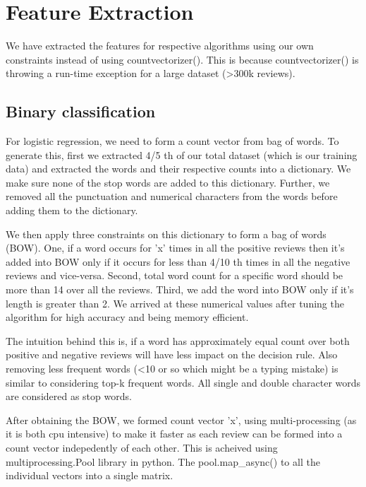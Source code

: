 \documentclass{article}
\begin{document}

\section{Feature Extraction}

We have extracted the features for respective algorithms using our own constraints instead of using countvectorizer(). This is because countvectorizer() is throwing a run-time exception for a large dataset (\textgreater300k reviews).

\subsection{Binary classification}
For logistic regression, we need to form a count vector from bag of words. To generate this, first we extracted 4/5 th of our total dataset (which is our training data) and extracted the words and their respective counts into a dictionary. We make sure none of the stop words are added to this dictionary. Further, we removed all the punctuation and numerical characters from the words before adding them to the dictionary. 


We then apply three constraints on this dictionary to form a bag of words (BOW). One, if a word occurs for 'x' times in all the positive reviews then it's added into BOW only if it occurs for less than 4/10 th times in all the negative reviews and vice-versa. Second, total word count for a specific word should be more than 14 over all the reviews. Third, we add the word into BOW only if it's length is greater than 2. We arrived at these numerical values after tuning the algorithm for high accuracy and being memory efficient. 


The intuition behind this is, if a word has approximately equal count over both positive and negative reviews will have less impact on the decision rule. Also removing less frequent words (\textless10 or so which might be a typing mistake) is similar to considering top-k frequent words. All single and double character words are considered as stop words.

After obtaining the BOW, we formed count vector 'x', using multi-processing (as it is both cpu intensive) to make it faster as each review can be formed into a count vector indepedently of each other. This is acheived using multiprocessing.Pool library in python. The pool.map\_async() to  all the individual vectors into a single matrix. 
\end{document}
